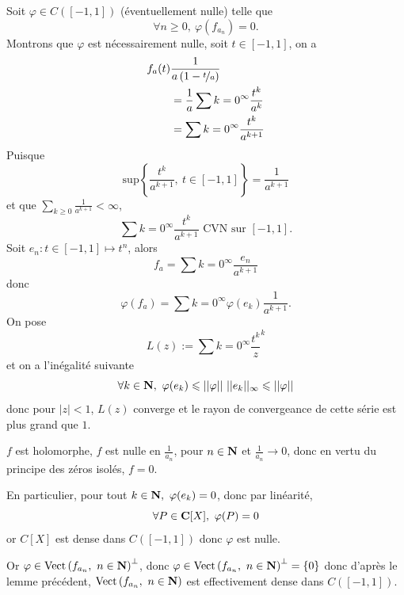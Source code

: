 \documentclass[a4paper,11pt, twoside]{article}
\begin{document}
\begin{Proof}
  Soit $\varphi\in C([-1,1])$ (éventuellement nulle) telle que 
  $$\forall n\geqslant 0,\ \varphi(f_{a_n})=0.$$
  Montrons que $\varphi$ est nécessairement nulle, soit $t\in[-1,1]$, on a 
  \begin{align*}
    f_a(t)&\frac{1}{a\left(1-\nicefrac{t}{a}\right)}\\
    &=\frac{1}{a}\sum{k=0}^\infty\frac{t^k}{a^k}\\
    &=\sum{k=0}^\infty\frac{t^k}{a^{k+1}}
  \end{align*}
  Puisque 
  $$\mathrm{sup}\left\{\frac{t^k}{a^{k+1}},\ t\in[-1,1]\right\}=\frac{1}{a^{k+1}}$$
  et que $\sum_{k\geqslant 0}\frac{1}{a^{k+1}}<\infty$,
  $$\sum{k=0}^\infty\frac{t^k}{a^{k+1}}\text{ CVN sur }[-1,1].$$
  Soit $e_n:t\in[-1,1]\longmapsto t^n$, alors 
  $$f_a=\sum{k=0}^\infty\frac{e_n}{a^{k+1}}$$
  donc
  $$\varphi(f_a)=\sum{k=0}^\infty\varphi(e_k)\frac{1}{a^{k+1}}.$$
  On pose 
  $$L(z):=\sum{k=0}^\infty\frac{t^k}z^k$$
  et on a l'inégalité suivante 
  $$\forall k\in\mathbf N,\ \varphi(e_k)\leqslant ||\varphi||\ ||e_k||_\infty\leqslant ||\varphi||$$
  donc pour $|z|<1$, $L(z)$ converge et le rayon de convergeance de cette série est plus grand que $1$.

  $f$ est holomorphe, $f$ est nulle en $\frac{1}{a_n}$, pour $n\in\mathbf N$ et $\frac{1}{a_n}\longrightarrow 0$, donc en vertu du principe des zéros isolés, $f=0$.

  En particulier, pour tout $k\in \N,\ \varphi(e_k)=0$, donc par linéarité, 
  $$\forall P\in \mathbf C[X],\ \varphi(P)=0$$
  or $C[X]$ est dense dans $C([-1,1])$ donc $\varphi$ est nulle.

  Or $\varphi\in \mathrm{Vect}\left(f_{a_n},\ n\in\N\right)^\bot$, donc $\varphi\in \mathrm{Vect}\left(f_{a_n},\ n\in\mathbf N\right)^\bot=\{0\}$ donc d'après le lemme précédent, $\mathrm{Vect}\left(f_{a_n},\ n\in\mathbf N\right)$ est effectivement dense dans $C([-1,1])$.
\end{Proof}


\setcounter{prop}{0}




\end{document}
